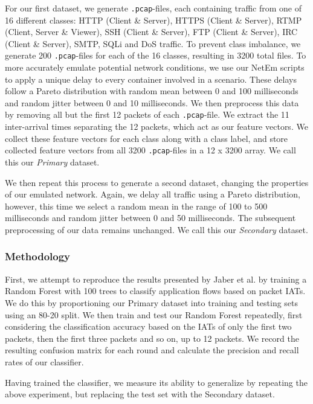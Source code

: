 \documentclass[sigconf]{acmart}
\begin{document}
For our first dataset, we generate \texttt{.pcap}-files, each containing traffic from one of 16 different classes: HTTP (Client \& Server), HTTPS (Client \& Server), RTMP (Client, Server \& Viewer), SSH (Client \& Server), FTP (Client \& Server), IRC (Client \& Server), SMTP, SQLi and DoS traffic. To prevent class imbalance, we generate 200 \texttt{.pcap}-files for each of the 16 classes, resulting in 3200 total files. To more accurately emulate potential network conditions, we use our NetEm scripts to apply a unique delay to every container involved in a scenario. These delays follow a Pareto distribution with random mean between 0 and 100 milliseconds and random jitter between 0 and 10 milliseconds. We then preprocess this data by removing all but the first 12 packets of each \texttt{.pcap}-file. We extract the 11 inter-arrival times separating the 12 packets, which act as our feature vectors. We collect these feature vectors for each class along with a class label, and store collected feature vectors from all 3200 \texttt{.pcap}-files in a 12 x 3200 array. We call this our \textit{Primary} dataset.

We then repeat this process to generate a second dataset, changing the properties of our emulated network. Again, we delay all traffic using a Pareto distribution, however, this time we select a random mean in the range of 100 to 500 milliseconds and random jitter between 0 and 50 milliseconds. The subsequent preprocessing of our data remains unchanged. We call this our \textit{Secondary} dataset.

\subsubsection*{Methodology}

\label{Sec:exp2_method}
First, we attempt to reproduce the results presented by Jaber et al. \cite{jaber2011can} by training a Random Forest with 100 trees to classify application flows based on packet IATs. We do this by proportioning our Primary dataset into training and testing sets using an 80-20 split. We then train and test our Random Forest repeatedly, first considering the classification accuracy based on the IATs of only the first two packets, then the first three packets and so on, up to 12 packets. We record the resulting confusion matrix for each round and calculate the precision and recall rates of our classifier.

Having trained the classifier, we measure its ability to generalize by repeating the above experiment, but replacing the test set with the Secondary dataset.
\end{document}
